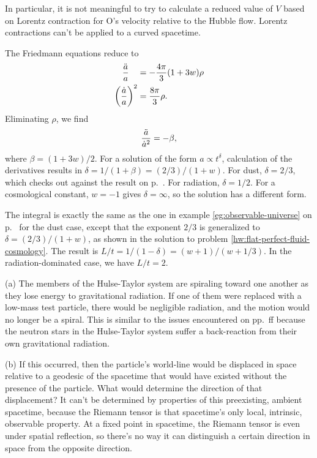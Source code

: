In particular, it is not meaningful to try to calculate a reduced
value of $V$ based on Lorentz contraction for O's velocity relative
to the Hubble flow. Lorentz contractions can't be applied to
a curved spacetime.

The Friedmann equations reduce to
\begin{align*}
  \frac{\ddot{a}}{a}   \quad          &= - \frac{4\pi}{3}(1+3w)\rho \\
  \left(\frac{\dot{a}}{a}\right)^2    &=  \frac{8\pi}{3}\rho.
\end{align*}
Eliminating $\rho$, we find
\begin{equation*}
  \frac{\ddot{a}}{\dot{a}^2} = -\beta,
\end{equation*}
where $\beta=(1+3w)/2$. For a solution of the form $a\propto t^\delta$, calculation of the
derivatives results in $\delta=1/(1+\beta)=(2/3)/(1+w)$. For dust, $\delta=2/3$, which checks
out against the result on p.~\pageref{flat-dust}. For radiation, $\delta=1/2$.
For a cosmological constant, $w= -1$ gives $\delta=\infty$, so the solution has a different form.

The integral is exactly the same as the one in example \ref{eg:observable-universe} on p.~\pageref{eg:observable-universe}
for the dust case, except that the exponent $2/3$ is generalized to $\delta=(2/3)/(1+w)$, as shown in the solution to
problem \ref{hw:flat-perfect-fluid-cosmology}. The result is $L/t=1/(1-\delta)=(w+1)/(w+1/3)$. In the radiation-dominated
case, we have $L/t=2$.


(a) The members of the Hulse-Taylor system are spiraling toward one another as they lose energy to
gravitational radiation. If one of them were replaced with a low-mass test particle, there
would be negligible radiation, and the motion would no longer be a spiral. This is similar
to the issues encountered on pp.~\pageref{sec:chiao-paradox}ff because the neutron stars in
the Hulse-Taylor system suffer a back-reaction from their own gravitational radiation.

(b) If this occurred, then the particle's world-line would be displaced in space relative
to a geodesic of the spacetime that would have existed without the presence of the particle.
What would determine the direction of that displacement?
It can't be determined by properties of this preexisting, ambient spacetime, because
the Riemann tensor is that spacetime's only local, intrinsic, observable property.
At a fixed point in spacetime, the Riemann tensor is even under spatial reflection, so there's no way it can distinguish
a certain direction in space from the opposite direction.


